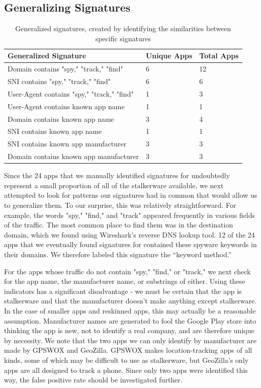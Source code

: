 \documentclass[acmtog]{acmart}
\begin{document}
\subsection{Generalizing Signatures}
\begin{table}
	\begin{tabular}{p{6cm}p{4cm}p{4cm}}
		\toprule
		Generalized Signature & Unique Apps & Total Apps \\
		\hline
		Domain contains "spy," "track," "find" & 6 & 12 \\
		SNI contains "spy," "track," "find" & 6 & 6 \\
		User-Agent contains "spy," "track," "find" & 1 & 3 \\
		User-Agent contains known app name & 1 & 1 \\
		Domain contains known app name & 3 & 4 \\
		SNI contains known app name & 1 & 1 \\
		SNI contains known app manufacturer & 3 & 3 \\
		Domain contains known app manufacturer & 3 & 3 \\
		\midrule
	\end{tabular}
	\caption{Generalized signatures, created by identifying the similarities 
		between specific signatures}
	\label{tab:gen}
\end{table}
Since the 24 apps that we manually identified signatures for undoubtedly 
represent a small proportion of all of the stalkerware available, we next 
attempted to look for patterns our signatures had in common that would allow us 
to generalize them. To our surprise, this was relatively straightforward.  
For example, the words "spy," "find," and "track" appeared frequently in 
various fields of the traffic. The most common place to find them was in the 
destination domain, which we found using Wireshark's reverse DNS lookup tool. 
12 of the 24 apps that we eventually found signatures for contained these 
spyware keywords in their domains. We therefore labeled this signature the 
``keyword method.''

For the apps whose traffic do not contain "spy," "find," or "track," we 
next check for the app name, the manufacturer name, or substrings of either. 
Using these indicators has a significant disadvantage - we must be certain that 
the app is stalkerware and that the manufacturer doesn't make anything except 
stalkerware. In the case of smaller apps and reskinned apps, this may actually 
be a reasonable assumption. Manufacturer names are generated to fool the 
Google Play store into thinking the app is new, not to identify a real company, 
and are therefore unique by necessity. We note that the two apps we can only 
identify by manufacturer are made by GPSWOX and GeoZilla. GPSWOX makes 
location-tracking apps of all kinds, some of which may be difficult to use as 
stalkerware, but GeoZilla's only apps are all designed to track a phone. Since 
only two apps were identified this way, the false positive rate should be 
investigated further. 
\end{document}
